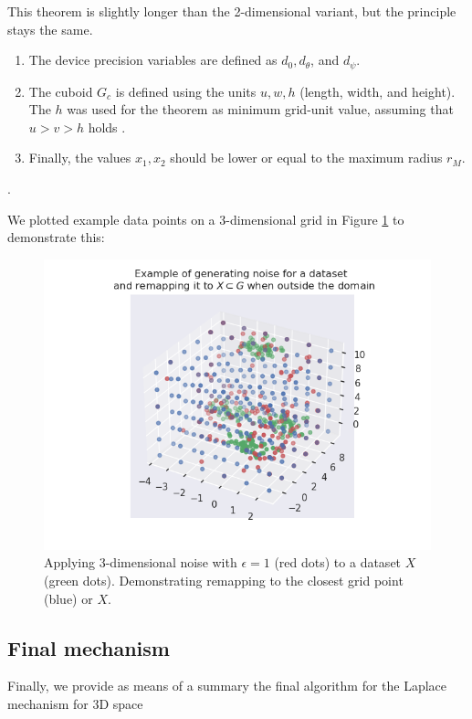 This theorem is slightly longer than the 2-dimensional variant, but the principle stays the same.
\begin{enumerate}
  \item The device precision variables are defined as $d_0, d_\theta$, and $d_\psi$.
  \item The cuboid $G_c$ is defined using the units $u, w, h$ (length, width, and height). The $h$ was used for the theorem as minimum grid-unit value, assuming that $u > v > h$ holds \citep{9646489}.
  \item Finally, the values $x_1, x_2$ should be lower or equal to the maximum radius $r_M$.
\end{enumerate}
.

We plotted example data points on a 3-dimensional grid in Figure \ref{fig:3d-laplace-example} to demonstrate this:
\begin{figure} [H]
  \includegraphics[width=\textwidth]{TheorethicalFramework/ND-Laplace/Images/example_3d_laplace.png}
  \caption{Applying 3-dimensional noise with $\epsilon = 1$ (red dots) to a dataset $X$ (green dots). Demonstrating remapping to the closest grid point (blue) or $X$.}
  \label{fig:3d-laplace-example}
\end{figure}

\newpage
\subsection{Final mechanism}
Finally, we provide as means of a summary the final algorithm for the Laplace mechanism for 3D space

\newpage